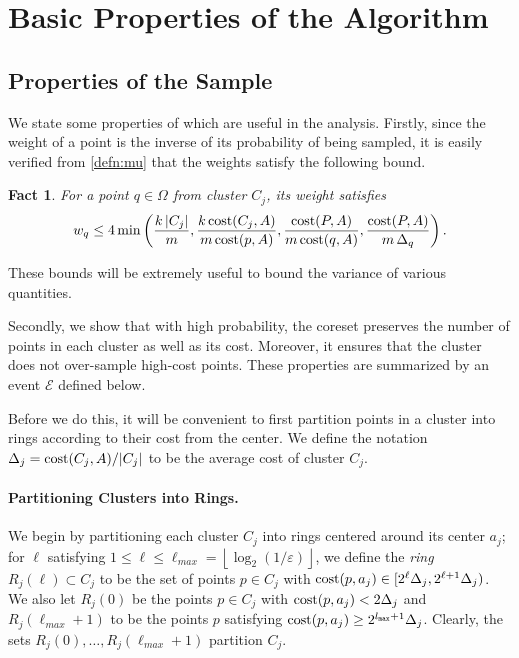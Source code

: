 \documentclass[11pt]{article}
\newtheorem{fact}[lemma]{Fact}
\theoremstyle{restate}
\theoremstyle{definition}
\newcommand{\eps}{\ensuremath{\varepsilon}}
\newcommand{\floor}[1]{{\left\lfloor{#1}\right\rfloor}}
\newcommand{\cost}{\textnormal{cost}}
\newcommand{\csize}{m}
\newcommand{\lmax}{l_\ensuremath{\textnormal{\texttt{max}}}}
\begin{document}
\section{Basic Properties of the Algorithm}

\subsection{Properties of the Sample}\label{sec: properties-of-sample}
\noindent We state some properties of  which are useful in the analysis. Firstly, since the weight of a point is the inverse of its probability of being sampled, it is easily verified from \eqref{defn:mu}  that the weights satisfy the following bound. 
\begin{fact}\label{lem: weight-bound}
	For a point $q \in \Omega$ from cluster $C_j$, its weight satisfies  
	\begin{equation*}
 w_q \leq 4\min\left(\frac{k\,|C_j|}{\csize}, \frac{k \, \cost(C_j,A)}{\csize\, \cost(p,A)}, \frac{\cost(P,A)}{\csize\, \cost(q,A)}, \frac{\cost(P,A)}{\csize \, \Delta_q}\right). 
 \end{equation*}
\end{fact}
These bounds will be extremely useful to bound the variance of various quantities.


Secondly, we show that with high probability, the coreset preserves the number of points in each cluster as well as its cost. Moreover, it ensures that the cluster does not over-sample high-cost points. These properties are summarized by an event $\mathcal{E}$ defined below.


Before we do this, it will be convenient to first partition points in a cluster into rings according to their cost from the center. We define the notation $\Delta_j = \cost(C_j,A)/|C_j|$ to be the average cost of cluster $C_j$.

\paragraph{Partitioning Clusters into Rings.} We begin by partitioning each cluster $C_j$ into rings centered around its center $a_j$; for $\ell$ satisfying $1 \leq \ell \leq \ell_{max} =  \floor{\log_2(1/\eps)}$, we define the \textit{ring} $R_j(\ell)\subset C_j$ to be the set of points $p \in C_j$ with $\cost(p,a_j) \in [2^{\ell} \Delta_j, 2^{\ell+1} \Delta_j)$. We also let $R_j(0)$ be the points $p \in C_j$ with $\cost(p,a_j) < 2 \Delta_j$ and $R_j(\ell_{max}+1)$ to be the points $p$ satisfying $\cost(p,a_j) \geq 2^{\lmax + 1}\Delta_j$. Clearly, the sets $R_j(0), \ldots, R_j(\ell_{max} +1)$ partition $C_j$.  
\end{document}
